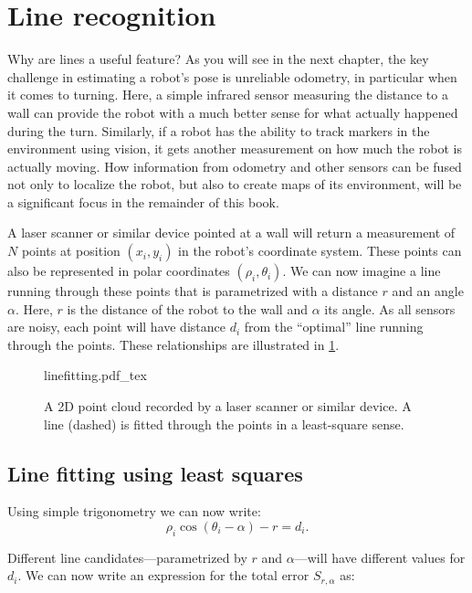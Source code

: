 \section{Line recognition}
Why are lines a useful feature? As you will see in the next chapter, the key challenge in estimating a robot's pose is unreliable odometry, in particular when it comes to turning. Here, a simple infrared sensor measuring the distance to a wall can provide the robot with a much better sense for what actually happened during the turn. Similarly, if a robot has the ability to track markers in the environment using vision, it gets another measurement on how much the robot is actually moving. How information from odometry and other sensors can be fused not only to localize the robot, but also to create maps of its environment, will be a significant focus in the remainder of this book.

A laser scanner or similar device pointed at a wall will return a measurement of $N$ points at position $(x_i,y_i)$ in the robot's coordinate system. These points can also be represented in polar coordinates $ (\rho_i,\theta_i)$. We can now imagine a line running through these points that is parametrized with a distance $r$ and an angle $\alpha$. Here, $r$ is the distance of the robot to the wall and $ \alpha$ its angle. As all sensors are noisy, each point will have distance $d_i$ from the ``optimal'' line running through the points. These relationships are illustrated in \cref{fig:linefitting}.

\begin{figure}
	\centering
    \def\svgwidth{\textwidth}
    {linefitting.pdf_tex}
	\caption{A 2D point cloud recorded by a laser scanner or similar device. A line (dashed) is fitted through the points in a least-square sense.}
	\label{fig:linefitting}
\end{figure}

\subsection{Line fitting using least squares}
Using simple trigonometry we can now write:
\begin{equation}
\rho_i \cos(\theta_i-\alpha)-r=d_i.
\end{equation}

Different line candidates---parametrized by $ r$ and $ \alpha$---will have different values for $ d_i$. We can now write an expression for the total error $ S_{r,\alpha}$ as:

